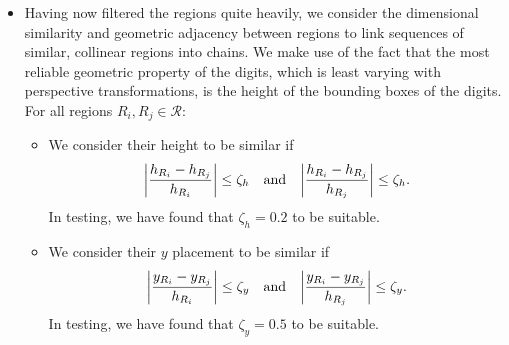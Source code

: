\documentclass{article}
\begin{document}
\begin{itemize}
\item
  Having now filtered the regions quite heavily, we consider the dimensional
  similarity and geometric adjacency between regions to link sequences of
  similar, collinear regions into chains.
  We make use of the fact that the most reliable geometric property of the
  digits, which is least varying with perspective transformations, is the height
  of the bounding boxes of the digits.
  For all regions $R_{i}, R_{j} \in \mathcal{R}$:
  \begin{itemize}
  \item
    We consider their height to be similar if
    \begin{equation*}
      \lrabs[\bigg]
      {
        \frac
        {
          h_{R_{i}}
          -
          h_{R_{j}}
        }
        {
          h_{R_{i}}
        }
      }
      \leq
      \zeta_{h}
      \qq{and}
      \lrabs[\bigg]
      {
        \frac
        {
          h_{R_{i}}
          -
          h_{R_{j}}
        }
        {
          h_{R_{j}}
        }
      }
      \leq
      \zeta_{h}
      .
    \end{equation*}
    In testing, we have found that $\zeta_{h} = 0.2$ to be suitable.

  \item
    We consider their $y$ placement to be similar if
    \begin{equation*}
      \lrabs[\bigg]
      {
        \frac
        {
          y_{R_{i}}
          -
          y_{R_{j}}
        }
        {
          h_{R_{i}}
        }
      }
      \leq
      \zeta_{y}
      \qq{and}
      \lrabs[\bigg]
      {
        \frac
        {
          y_{R_{i}}
          -
          y_{R_{j}}
        }
        {
          h_{R_{j}}
        }
      }
      \leq
      \zeta_{y}
      .
    \end{equation*}
    In testing, we have found that $\zeta_{y} = 0.5$ to be suitable.


\end{itemize}
\end{itemize}
\end{document}
